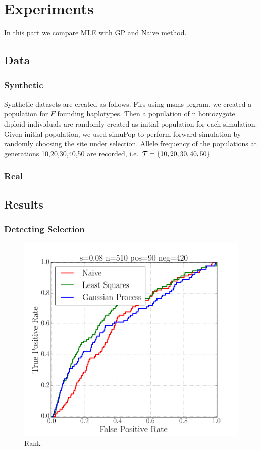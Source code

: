 \section{Experiments}
In this part we compare MLE with GP and Naive method. 
\subsection{Data}
\subsubsection{Synthetic}
Synthetic datasets are created as follows. Firs using msms prgram, we created a population for $F$ founding haplotypes. Then a population of n homozygote diploid individuals are randomly created as initial population for each simulation. Given initial population, we used simuPop to perform forward simulation by randomly choosing the site under selection. Allele frequency of the populations at generations 10,20,30,40,50 are recorded, i.e. ${\cal T}=\{10,20,30,40,50\}$
\subsubsection{Real}

\subsection{Results}
\subsubsection{Detecting Selection}
\begin{figure}[H]
  \centering
    \includegraphics[width=\textwidth]{roc008}
  \caption{Rank}
  \label{fig:Fig3}
\end{figure}

